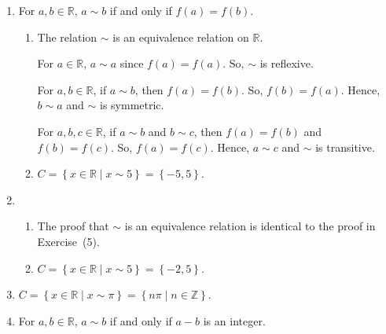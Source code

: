 \begin{enumerate}
\addtocounter{enumi}{1}
\item For  $a, b \in \mathbb{R}$,  $a \sim b$ if and only if  
$f\left( a \right) = f\left( b \right)$.
\begin{enumerate}
\item The relation $\sim$ is an equivalence relation on $\mathbb{R}$.  

For $a \in \mathbb{R}$, $a \sim a$ since $f \left( a \right) = f \left( a \right)$.  So, $\sim$ is reflexive.

For $a, b \in \mathbb{R}$, if $a \sim b$, then  $f \left( a \right) = f \left( b \right)$.  So, 
$f \left( b \right) = f \left( a \right)$. Hence, $b \sim a$ and $\sim$ is symmetric.

For $a, b,c  \in \mathbb{R}$, if $a \sim b$ and $b \sim c$, then  
$f \left( a \right) = f \left( b \right)$ and $f \left( b \right) = f \left( c \right)$.  So, 
$f \left( a \right) = f \left( c \right)$. Hence, $a \sim c$ and $\sim$ is transitive.

\item  $C = \left\{ { {x \in \mathbb{R} } \mid x \sim 5} \right\} = \left\{ -5, 5 \right\}$.
\end{enumerate}



\item \begin{enumerate}
\item The proof that $\sim$ is an equivalence relation is identical to the proof in Exercise~(5).

\item  $C = \left\{ { {x \in \mathbb{R} } \mid x \sim 5} \right\} = \left\{ -2, 5 \right\}$.
\end{enumerate}



\item $C = \left\{ { {x \in \mathbb{R} } \mid x \sim \pi} \right\} = 
\left\{ n \pi \mid n \in \mathbb{Z} \right\}$.



\item For  $a, b \in \mathbb{R}$,  $a \sim b$  if and only if   $a - b$  is an integer.
\begin{enumerate}
%
%
%


\end{enumerate}
\end{enumerate}
